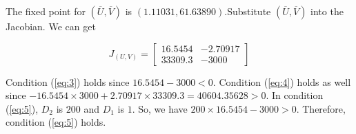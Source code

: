 \documentclass[12pt]{article}
\begin{document}
The fixed point for $(\overline{U},\overline{V})$  is $(1.11031,61.63890)$.Substitute $(\overline{U},\overline{V})$ into the Jacobian. We can get

\begin{equation*}
J_{(U,V)}= \begin{bmatrix}
16.5454	 & -2.70917\\
33309.3 & -3000
\end{bmatrix}
\end{equation*}

Condition (\ref{eq:3}) holds since $16.5454-3000<0$.
Condition (\ref{eq:4}) holds as well since $-16.5454\times3000+2.70917\times33309.3=40604.35628>0$.
In condition (\ref{eq:5}), $D_2$ is $200$ and $D_1$ is $1$. So, we have $200 \times 16.5454-3000>0$. 
Therefore, condition (\ref{eq:5}) holds.
\end{document}
